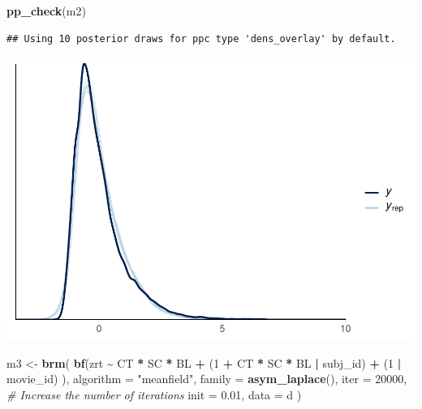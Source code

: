 \documentclass[
]{article}
\newenvironment{Shaded}{\begin{snugshade}}{\end{snugshade}}
\newcommand{\AttributeTok}[1]{\textcolor[rgb]{0.13,0.29,0.53}{#1}}
\newcommand{\CommentTok}[1]{\textcolor[rgb]{0.56,0.35,0.01}{\textit{#1}}}
\newcommand{\DecValTok}[1]{\textcolor[rgb]{0.00,0.00,0.81}{#1}}
\newcommand{\FloatTok}[1]{\textcolor[rgb]{0.00,0.00,0.81}{#1}}
\newcommand{\FunctionTok}[1]{\textcolor[rgb]{0.13,0.29,0.53}{\textbf{#1}}}
\newcommand{\NormalTok}[1]{#1}
\newcommand{\OtherTok}[1]{\textcolor[rgb]{0.56,0.35,0.01}{#1}}
\newcommand{\SpecialCharTok}[1]{\textcolor[rgb]{0.81,0.36,0.00}{\textbf{#1}}}
\newcommand{\StringTok}[1]{\textcolor[rgb]{0.31,0.60,0.02}{#1}}
\begin{document}
\begin{Shaded}
\begin{Highlighting}[]
\FunctionTok{pp\_check}\NormalTok{(m2)}
\end{Highlighting}
\end{Shaded}

\begin{verbatim}
## Using 10 posterior draws for ppc type 'dens_overlay' by default.
\end{verbatim}

\includegraphics{20_variational_inference_files/figure-latex/Model with block as factor-1.pdf}

\begin{Shaded}
\begin{Highlighting}[]
\NormalTok{m3 }\OtherTok{\textless{}{-}} \FunctionTok{brm}\NormalTok{(}
  \FunctionTok{bf}\NormalTok{(zrt }\SpecialCharTok{\textasciitilde{}}\NormalTok{ CT }\SpecialCharTok{*}\NormalTok{ SC }\SpecialCharTok{*}\NormalTok{ BL }\SpecialCharTok{+}
\NormalTok{       (}\DecValTok{1} \SpecialCharTok{+}\NormalTok{ CT }\SpecialCharTok{*}\NormalTok{ SC }\SpecialCharTok{*}\NormalTok{ BL }\SpecialCharTok{|}\NormalTok{ subj\_id) }\SpecialCharTok{+}\NormalTok{ (}\DecValTok{1} \SpecialCharTok{|}\NormalTok{ movie\_id)}
\NormalTok{  ), }
  \AttributeTok{algorithm =} \StringTok{"meanfield"}\NormalTok{,}
  \AttributeTok{family =} \FunctionTok{asym\_laplace}\NormalTok{(),}
  \AttributeTok{iter =} \DecValTok{20000}\NormalTok{, }\CommentTok{\# Increase the number of iterations}
  \AttributeTok{init =} \FloatTok{0.01}\NormalTok{,}
  \AttributeTok{data =}\NormalTok{ d}
\NormalTok{)}
\end{Highlighting}
\end{Shaded}
\end{document}
